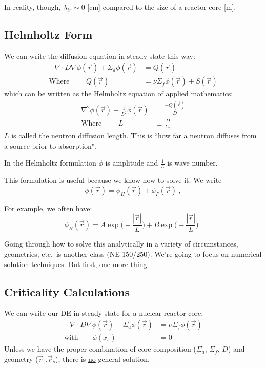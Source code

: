 \documentclass[12pt]{article}
\begin{document}
In reality, though, $\lambda_{tr} \sim 0$ [cm] compared to the size of a reactor core [m]. 


\subsection{Helmholtz Form}

We can write the diffusion equation in steady state this way:
%
\begin{align}
-\nabla \cdot D\nabla \phi(\vec{r}) + 
\Sigma_a \phi(\vec{r}) &= Q(\vec{r}) \\
%
\text{Where }\qquad Q(\vec{r}) &=
\nu \Sigma_f \phi(\vec{r}) +
S(\vec{r})
\end{align}
%
which can be written as the Helmholtz equation of applied mathematics:
%
\begin{align}
\nabla^2 \phi(\vec{r}) - \frac{1}{L^2}\phi(\vec{r}) &= \frac{-Q(\vec{r})}{D} \\
\text{Where }\qquad L &\equiv \frac{D}{\Sigma_a}
\end{align}
%
$L$ is called the neutron diffusion length. This is ``how far a neutron diffuses from a source prior to absorption". 

In the Helmholtz formulation $\phi$ is amplitude and $\frac{1}{L}$ is wave number. 

This formulation is useful because we know how to solve it. We write
\[\phi(\vec{r}) = \phi_H(\vec{r}) + \phi_P(\vec{r}) \:,\]

For example, we often have:
\[\phi_H(\vec{r}) = A\exp\bigl(-\frac{|\vec{r}|}{L}\bigr) + B\exp\bigl(-\frac{|\vec{r}|}{L}\bigr) \:.\]

Going through how to solve this analytically in a variety of circumstances, geometries, etc.\ is another class (NE 150/250). We're going to focus on numerical solution techniques. But first, one more thing.

\subsection{Criticality Calculations}

We can write our DE in steady state for a nuclear reactor core:
%
\begin{align}
-\nabla \cdot D\nabla \phi(\vec{r}) + 
\Sigma_a \phi(\vec{r}) &= \nu \Sigma_f \phi(\vec{r}) \\
\text{with} \qquad \phi(\tilde{x}_s) &= 0
\end{align}
%
Unless we have the proper combination of core composition ($\Sigma_a$, $\Sigma_f$, $D$) and geometry ($\vec{r}$ ,$\vec{r}_s$), there is \underline{no} general solution. 
\end{document}
